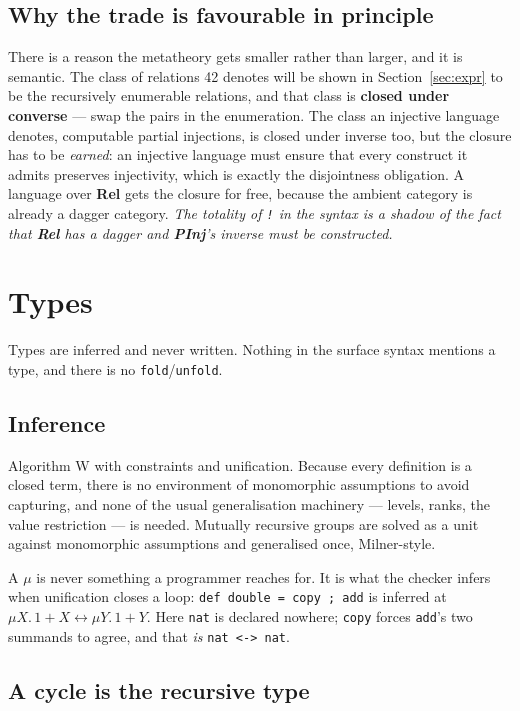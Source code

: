 \documentclass[runningheads,envcountsame]{llncs}
\newcommand{\iso}{\leftrightarrow}
\newcommand{\Rel}{\textbf{Rel}}
\newcommand{\PInj}{\textbf{PInj}}
\begin{document}
\subsection{Why the trade is favourable in principle}

There is a reason the metatheory gets smaller rather than larger, and it is
semantic. The class of relations 42 denotes will be shown in
Section~\ref{sec:expr} to be the recursively enumerable relations, and that class
is \textbf{closed under converse} --- swap the pairs in the enumeration. The class
an injective language denotes, computable partial injections, is closed under
inverse too, but the closure has to be \emph{earned}: an injective language must
ensure that every construct it admits preserves injectivity, which is exactly the
disjointness obligation. A language over \Rel{} gets the closure for free, because
the ambient category is already a dagger category. \emph{The totality of \texttt{!}
in the syntax is a shadow of the fact that \Rel{} has a dagger and \PInj{}'s
inverse must be constructed.}

\section{Types}\label{sec:types}

Types are inferred and never written. Nothing in the surface syntax mentions a
type, and there is no \texttt{fold}/\texttt{unfold}.

\subsection{Inference}

Algorithm W with constraints and unification. Because every definition is a closed
term, there is no environment of monomorphic assumptions to avoid capturing, and
none of the usual generalisation machinery --- levels, ranks, the value restriction
--- is needed. Mutually recursive groups are solved as a unit against monomorphic
assumptions and generalised once, Milner-style.

A $\mu$ is never something a programmer reaches for. It is what the checker infers
when unification closes a loop: \texttt{def double = copy ; add} is inferred at
$\mu X.\,1 + X \iso \mu Y.\,1 + Y$. Here \texttt{nat} is declared nowhere;
\texttt{copy} forces \texttt{add}'s two summands to agree, and that \emph{is}
\texttt{nat <-> nat}.

\subsection{A cycle is the recursive type}
\end{document}
